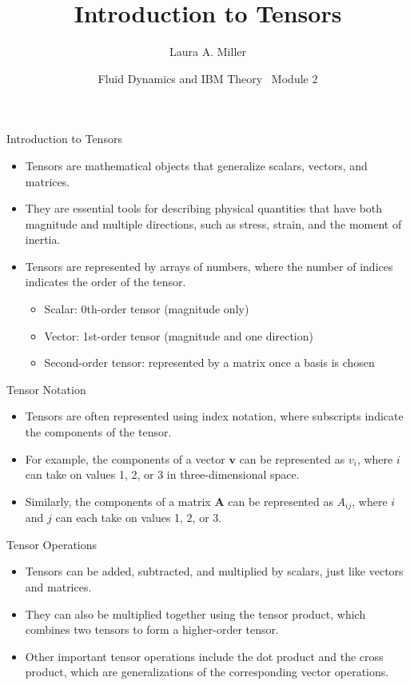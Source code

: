 \documentclass[aspectratio=169,11pt]{beamer}
\title{Introduction to Tensors}
\author{Laura A. Miller}
\institute{Department of Mathematics, University of Arizona}
\date{Fluid Dynamics and IBM Theory \textbullet\ Module 2}
\begin{document}
\begin{frame}[plain,b]
\maketutorialtitle
\end{frame}

\begin{frame}{Introduction to Tensors}
    \begin{itemize}
        \item Tensors are mathematical objects that generalize scalars, vectors, and matrices. 
        \item They are essential tools for describing physical quantities that have both magnitude and multiple directions, such as stress, strain, and the moment of inertia.
        \item Tensors are represented by arrays of numbers, where the number of indices indicates the order of the tensor. 
        \begin{itemize}
            \item Scalar: 0th-order tensor (magnitude only) 
            \item Vector: 1st-order tensor (magnitude and one direction) 
            \item Second-order tensor: represented by a matrix once a basis is chosen
        \end{itemize}
    \end{itemize}
\end{frame}

\begin{frame}{Tensor Notation}
    \begin{itemize}
        \item Tensors are often represented using index notation, where subscripts indicate the components of the tensor. 
        \item For example, the components of a vector $\mathbf{v}$ can be represented as $v_i$, where $i$ can take on values 1, 2, or 3 in three-dimensional space. 
        \item Similarly, the components of a matrix $\mathbf{A}$ can be represented as $A_{ij}$, where $i$ and $j$ can each take on values 1, 2, or 3. 
    \end{itemize}
\end{frame}

\begin{frame}{Tensor Operations}
    \begin{itemize}
        \item Tensors can be added, subtracted, and multiplied by scalars, just like vectors and matrices. 
        \item They can also be multiplied together using the tensor product, which combines two tensors to form a higher-order tensor. 
        \item Other important tensor operations include the dot product and the cross product, which are generalizations of the corresponding vector operations. 
    \end{itemize}
\end{frame}
\end{document}
